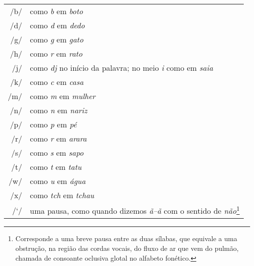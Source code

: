 \begingroup
\begin{tabular}{rl}
/b/ & como \textit{b} em \textit{boto}\\
/d/ & como \textit{d} em \textit{dedo}\\
/g/ & como \textit{g} em \textit{gato}\\
/h/ & como \textit{r} em \textit{rato}\\
/j/ & como \textit{dj} no início da palavra; no meio \textit{i} como em \textit{saia}\\
/k/ & como \textit{c} em \textit{casa}\\
/m/ & como \textit{m} em \textit{mulher}\\
/n/ & como \textit{n} em \textit{nariz}\\
/p/ & como \textit{p} em \textit{pé}\\
/r/ & como \textit{r} em \textit{arara}\\
/s/ & como \textit{s} em \textit{sapo}\\
/t/ & como \textit{t} em \textit{tatu}\\
/w/ & como \textit{u} em \textit{água}\\
/x/ & como \textit{tch} em \textit{tchau}\\
/`/ & uma pausa, como quando dizemos \textit{ã--ã} com o sentido de \textit{não}\footnote{Corresponde a uma breve pausa entre as duas sílabas, que equivale a uma obstrução, na região das cordas vocais, do fluxo de ar que vem do pulmão, chamada de consoante oclusiva glotal no alfabeto fonético.} 
\end{tabular}
\endgroup